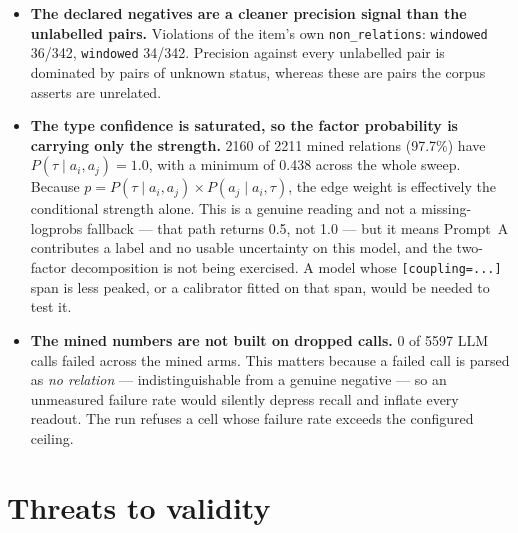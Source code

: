 \documentclass[11pt]{article}
\begin{document}
\begin{itemize}
\item \textbf{The declared negatives are a cleaner precision signal than the unlabelled pairs.} Violations of the item's own \texttt{non\_relations}: \texttt{windowed} 36/342, \texttt{windowed} 34/342. Precision against every unlabelled pair is dominated by pairs of unknown status, whereas these are pairs the corpus asserts are unrelated.
\item \textbf{The type confidence is saturated, so the factor probability is carrying only the strength.} 2160 of 2211 mined relations (97.7\%) have $P(\tau \mid a_i,a_j) = 1.0$, with a minimum of 0.438 across the whole sweep. Because $p = P(\tau \mid a_i,a_j) \times P(a_j \mid a_i,\tau)$, the edge weight is effectively the conditional strength alone. This is a genuine reading and not a missing-logprobs fallback --- that path returns 0.5, not 1.0 --- but it means Prompt~A contributes a label and no usable uncertainty on this model, and the two-factor decomposition is not being exercised. A model whose \texttt{[coupling=...]} span is less peaked, or a calibrator fitted on that span, would be needed to test it.
\item \textbf{The mined numbers are not built on dropped calls.} 0 of 5597 LLM calls failed across the mined arms. This matters because a failed call is parsed as \emph{no relation} --- indistinguishable from a genuine negative --- so an unmeasured failure rate would silently depress recall and inflate every readout. The run refuses a cell whose failure rate exceeds the configured ceiling.
\end{itemize}

\section{Threats to validity}
\end{document}
